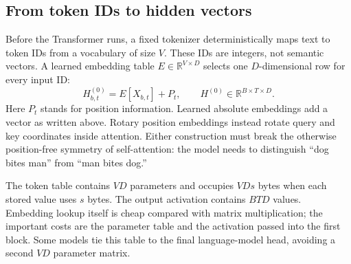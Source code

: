 \subsection{From token IDs to hidden vectors}

Before the Transformer runs, a fixed tokenizer deterministically maps text to token IDs
from a vocabulary of size $V$. These IDs are integers, not semantic vectors. A learned embedding table
$E\in\mathbb{R}^{V\times D}$ selects one $D$-dimensional row for every input ID:
\begin{equation}
  H^{(0)}_{b,t}=E[X_{b,t}]+P_t,
  \qquad H^{(0)}\in\mathbb{R}^{B\times T\times D}.
\end{equation}
Here $P_t$ stands for position information. Learned absolute embeddings add a vector as
written above. Rotary position embeddings instead rotate query and key coordinates
inside attention. Either construction must break the otherwise position-free symmetry of
self-attention: the model needs to distinguish ``dog bites man'' from ``man bites dog.''

The token table contains $VD$ parameters and occupies $VDs$ bytes when each stored value
uses $s$ bytes. The output activation contains $BTD$ values. Embedding lookup itself is
cheap compared with matrix multiplication; the important costs are the parameter table
and the activation passed into the first block. Some models tie this table to the final
language-model head, avoiding a second $VD$ parameter matrix.
